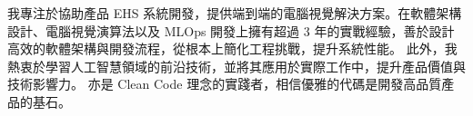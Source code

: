 

\begin{cvparagraph}

我專注於協助產品 EHS 系統開發，提供端到端的電腦視覺解決方案。在軟體架構設計、電腦視覺演算法以及 MLOps 
開發上擁有超過 3 年的實戰經驗，善於設計高效的軟體架構與開發流程，從根本上簡化工程挑戰，提升系統性能。
此外，我熱衷於學習人工智慧領域的前沿技術，並將其應用於實際工作中，提升產品價值與技術影響力。
亦是 Clean Code 理念的實踐者，相信優雅的代碼是開發高品質產品的基石。


\end{cvparagraph}
